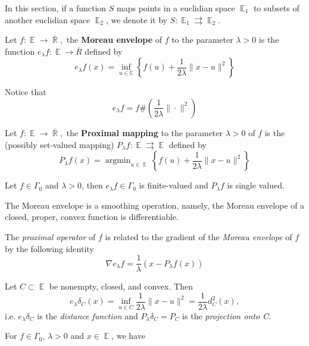 \documentclass{tufte-handout}
\DeclareMathOperator{\argmin}{argmin}
\DeclareMathOperator{\R}{\mathbb{R}}
\DeclareMathOperator{\E}{\mathbb{E}}
\begin{document}
{  In this section, if a function $S$ maps points in a euclidian space $\E_1$ to subsets of another euclidian space $\E_2$, we denote it by $S: \E_1 \rightrightarrows \E_2$. 
  \begin{definition}
    Let $f: \E \to \overline{\R},$ the \textbf{Moreau envelope} of $f$ to the parameter $\lambda> 0$ is the function $e_\lambda f: \E \to \overline{R}$ defined by 
    $$e_\lambda f(x) = \inf_{u \in \mathbb{E}} \left\{f(u) + \frac{1}{2 \lambda} \| x - u\| ^2\right\} $$
  \end{definition}
  \begin{remark} 
  Notice that 
    $$e_\lambda f = f\# \left( \frac{1}{2\lambda } \| \cdot \|^2 \right) $$
  \end{remark}
  \begin{definition}
    Let $f: \E \to \overline{\R},$ the \textbf{Proximal mapping} to the parameter $\lambda >0$ of $f$ is the (possibly set-valued mapping) $P_\lambda f: \E \rightrightarrows \E$ defined by
    $$P_\lambda f(x) = \argmin_{u\in \E} \left\{f(u) + \frac{1}{2 \lambda} \| x - u\| ^2\right\}  $$
  \end{definition}
  \begin{proposition} 
    Let $f \in \Gamma_0$ and $\lambda >0$, then $e_ \lambda f \in \Gamma_0$ is finite-valued and $P_\lambda f$ is single valued. 
  \end{proposition}
  \begin{remark} 
    The Moreau envelope is a smoothing operation, namely, the Moreau envelope of a closed, proper, convex function is differentiable.
  \end{remark}
  \begin{proposition} \label{label}
      The \textit{proximal operator} of $f$ is related to the gradient of the \textit{Moreau envelope} of $f$ by the following identity 
      $$\nabla e_\lambda f = \frac{1}{\lambda} (x - P_\lambda f (x)) $$
  \end{proposition}
  \begin{example}
    Let $C \subset \E$ be nonempty, closed, and convex. Then 
    $$e_\lambda \delta _C (x) = \inf_{u \in C} \frac{1}{2 \lambda} \| x- u\| ^2 = \frac{1}{2\lambda } d_C^2 (x), $$
    i.e. $e_\lambda \delta_C$ is the \textit{distance function} and $P_\lambda \delta_C=P_C$ is the \textit{projection onto C.}  
  \end{example}
  \begin{remark} 
    For $f\in \Gamma_0$, $\lambda> 0$ and $x \in \E$, we have 

\end{remark}}
\end{document}
